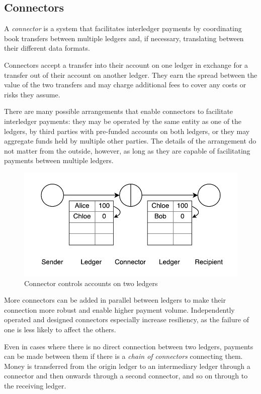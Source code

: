 \documentclass[letterpaper,twocolumn,10pt]{article}
\begin{document}
\subsection{Connectors}

A \textit{connector} is a system that facilitates interledger payments by coordinating book transfers between multiple ledgers and, if necessary, translating between their different data formats.

Connectors accept a transfer into their account on one ledger in exchange for a transfer out of their account on another ledger. They earn the spread between the value of the two transfers and may charge additional fees to cover any costs or risks they assume.

There are many possible arrangements that enable connectors to facilitate interledger payments: they may be operated by the same entity as one of the ledgers, by third parties with pre-funded accounts on both ledgers, or they may aggregate funds held by multiple other parties. The details of the arrangement do not matter from the outside, however, as long as they are capable of facilitating payments between multiple ledgers.

\begin{figure}[ht]
    \centering
    \includegraphics[width=\columnwidth]{figures/connector.pdf}
    \caption{Connector controls accounts on two ledgers}
    \label{fig:connector}
\end{figure}

More connectors can be added in parallel between ledgers to make their connection more robust and enable higher payment volume. Independently operated and designed connectors especially increase resiliency, as the failure of one is less likely to affect the others.

Even in cases where there is no direct connection between two ledgers, payments can be made between them if there is a \textit{chain of connectors} connecting them. Money is transferred from the origin ledger to an intermediary ledger through a connector and then onwards through a second connector, and so on through to the receiving ledger.
\end{document}
